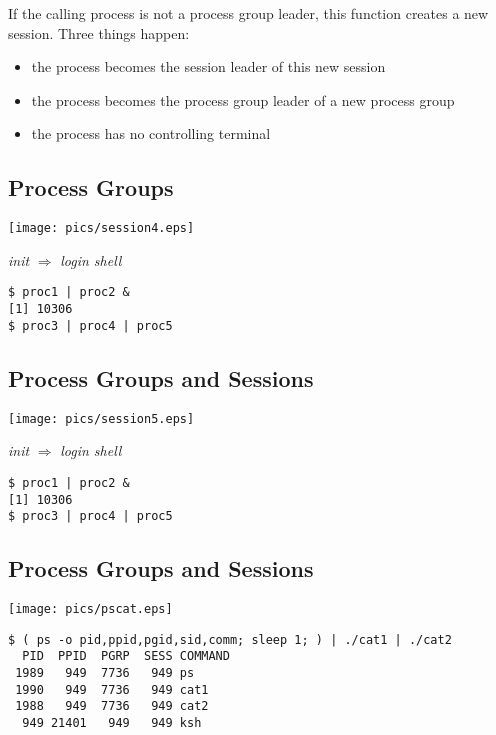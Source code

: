 \documentclass[xga]{xdvislides}
\begin{document}
If the calling process is not a process group leader, this
function creates a new session.  Three things happen:
\begin{itemize}
	\item the process becomes the session leader of this new session
	\item the process becomes the process group leader of a new process group
	\item the process has no controlling terminal
\end{itemize}

\subsection{Process Groups}
\begin{center}
	\texttt{[image: pics/session4.eps]}
\end{center}

{\em init} $\Rightarrow$ {\em login shell}
\begin{verbatim}
$ proc1 | proc2 &
[1] 10306
$ proc3 | proc4 | proc5

\end{verbatim}

\subsection{Process Groups and Sessions}
\begin{center}
	\texttt{[image: pics/session5.eps]}
\end{center}

{\em init} $\Rightarrow$ {\em login shell}
\begin{verbatim}
$ proc1 | proc2 &
[1] 10306
$ proc3 | proc4 | proc5
\end{verbatim}


\subsection{Process Groups and Sessions}
\begin{center}
	\texttt{[image: pics/pscat.eps]}
\end{center}
\begin{verbatim}
$ ( ps -o pid,ppid,pgid,sid,comm; sleep 1; ) | ./cat1 | ./cat2
  PID  PPID  PGRP  SESS COMMAND
 1989   949  7736   949 ps
 1990   949  7736   949 cat1
 1988   949  7736   949 cat2
  949 21401   949   949 ksh
\end{verbatim}
\end{document}
